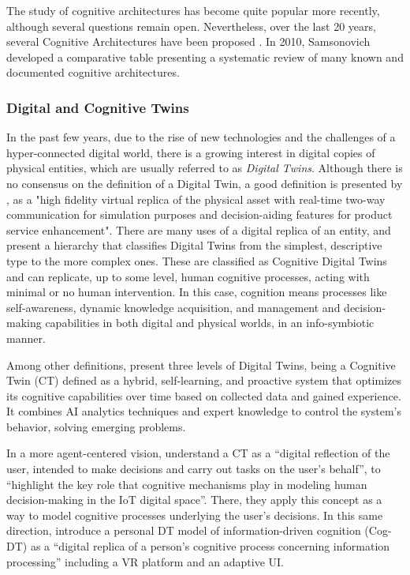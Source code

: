 The study of cognitive architectures has become quite popular more recently, although several questions remain open. Nevertheless, over the last 20 years, several Cognitive Architectures have been proposed \citep{goertzel2014brief, kotseruba2016review}. In 2010, Samsonovich \citep{samsonovich2010toward} developed a comparative table presenting a systematic review of many known and documented cognitive architectures.

\subsubsection{Digital and Cognitive Twins}

In the past few years, due to the rise of new technologies and the challenges of a hyper-connected digital world, there is a growing interest in digital copies of physical entities, which are usually referred to as \emph{Digital Twins}. Although there is no consensus on the definition of a Digital Twin, a good definition is presented by \cite{lim2019state}, as a "high fidelity virtual replica of the physical asset with real-time two-way communication for simulation purposes and decision-aiding features for product service enhancement". 
There are many uses of a digital replica of an entity, and \cite{zhang2020towards} present a hierarchy that classifies Digital Twins from the simplest, descriptive type to the more complex ones. These are classified as Cognitive Digital Twins and can replicate, up to some level, human cognitive processes, acting with minimal or no human intervention. In this case, cognition means processes like self-awareness, dynamic knowledge acquisition, and management and decision-making capabilities in both digital and physical worlds, in an info-symbiotic manner.

Among other definitions, \cite{abburu2020cognitwin} present three levels of Digital Twins, being a Cognitive Twin (CT) defined as a hybrid, self-learning, and proactive system that optimizes its cognitive capabilities over time based on collected data and gained experience. It combines AI analytics techniques and expert knowledge to control the system's behavior, solving emerging problems.

In a more agent-centered vision, \cite{somers2020cognitive} understand a CT as a “digital reflection of the user, intended to make decisions and carry out tasks on the user's behalf”, to “highlight the key role that cognitive mechanisms play in modeling human decision-making in the IoT digital space”. There, they apply this concept as a way to model cognitive processes underlying the user’s decisions. In this same direction, \cite{du2020cognition} introduce a personal DT model of information-driven cognition (Cog-DT) as a “digital replica of a person’s cognitive process concerning information processing” including a VR platform and an adaptive UI.

